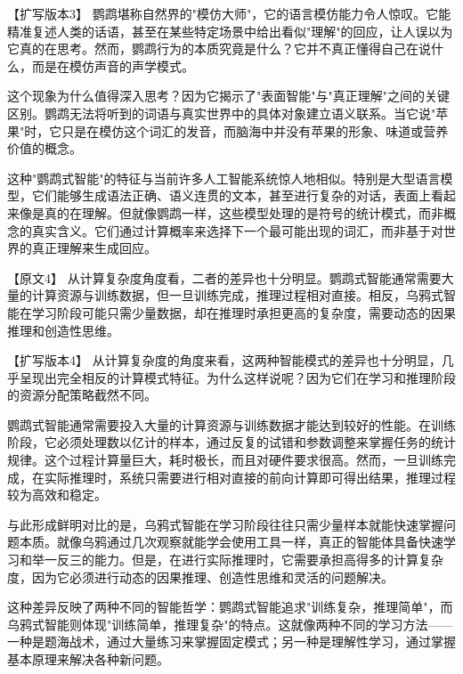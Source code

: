 【扩写版本3】
鹦鹉堪称自然界的"模仿大师"，它的语言模仿能力令人惊叹。它能精准复述人类的话语，甚至在某些特定场景中给出看似"理解"的回应，让人误以为它真的在思考。然而，鹦鹉行为的本质究竟是什么？它并不真正懂得自己在说什么，而是在模仿声音的声学模式。

这个现象为什么值得深入思考？因为它揭示了"表面智能"与"真正理解"之间的关键区别。鹦鹉无法将听到的词语与真实世界中的具体对象建立语义联系。当它说"苹果"时，它只是在模仿这个词汇的发音，而脑海中并没有苹果的形象、味道或营养价值的概念。

这种"鹦鹉式智能"的特征与当前许多人工智能系统惊人地相似。特别是大型语言模型，它们能够生成语法正确、语义连贯的文本，甚至进行复杂的对话，表面上看起来像是真的在理解。但就像鹦鹉一样，这些模型处理的是符号的统计模式，而非概念的真实含义。它们通过计算概率来选择下一个最可能出现的词汇，而非基于对世界的真正理解来生成回应。

【原文4】
从计算复杂度角度看，二者的差异也十分明显。鹦鹉式智能通常需要大量的计算资源与训练数据，但一旦训练完成，推理过程相对直接。相反，乌鸦式智能在学习阶段可能只需少量数据，却在推理时承担更高的复杂度，需要动态的因果推理和创造性思维。

【扩写版本4】
从计算复杂度的角度来看，这两种智能模式的差异也十分明显，几乎呈现出完全相反的计算模式特征。为什么这样说呢？因为它们在学习和推理阶段的资源分配策略截然不同。

鹦鹉式智能通常需要投入大量的计算资源与训练数据才能达到较好的性能。在训练阶段，它必须处理数以亿计的样本，通过反复的试错和参数调整来掌握任务的统计规律。这个过程计算量巨大，耗时极长，而且对硬件要求很高。然而，一旦训练完成，在实际推理时，系统只需要进行相对直接的前向计算即可得出结果，推理过程较为高效和稳定。

与此形成鲜明对比的是，乌鸦式智能在学习阶段往往只需少量样本就能快速掌握问题本质。就像乌鸦通过几次观察就能学会使用工具一样，真正的智能体具备快速学习和举一反三的能力。但是，在进行实际推理时，它需要承担高得多的计算复杂度，因为它必须进行动态的因果推理、创造性思维和灵活的问题解决。

这种差异反映了两种不同的智能哲学：鹦鹉式智能追求"训练复杂，推理简单"，而乌鸦式智能则体现"训练简单，推理复杂"的特点。这就像两种不同的学习方法——一种是题海战术，通过大量练习来掌握固定模式；另一种是理解性学习，通过掌握基本原理来解决各种新问题。
